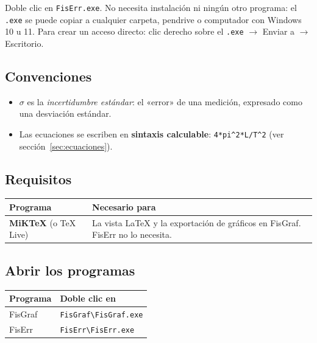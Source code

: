 \documentclass[11pt,a4paper]{article}
\newif\ifportable
\newcommand{\filarust}{}
\newcommand{\filarust}{\textbf{Rust} & Solo para compilar los programas (crear o actualizar los \code{.exe}).\\}
\newcommand{\code}[1]{\texttt{#1}}
\newcommand{\bs}{\textbackslash}
\newcommand{\menu}[1]{\textsf{#1}}
\begin{document}
Doble clic en \code{FisErr.exe}. No necesita instalación ni ningún otro programa: el \code{.exe} se puede copiar a cualquier carpeta, pendrive o computador con Windows 10 u 11. Para crear un acceso directo: clic derecho sobre el \code{.exe} $\rightarrow$ \menu{Enviar a} $\rightarrow$ \menu{Escritorio}.

\subsection{Convenciones}

\begin{itemize}
  \item $\sigma$ es la \emph{incertidumbre estándar}: el «error» de una medición, expresado como una desviación estándar.
  \item Las ecuaciones se escriben en \textbf{sintaxis calculable}: \code{4*pi\^{}2*L/T\^{}2} (ver sección~\ref{sec:ecuaciones}).
\end{itemize}
\else

\subsection{Requisitos}

\begin{tabularx}{\linewidth}{@{}lX@{}}\toprule
\textbf{Programa} & \textbf{Necesario para}\\\midrule
\textbf{MiKTeX} (o TeX Live) & La vista LaTeX y la exportación de gráficos en FisGraf. FisErr no lo necesita.\\
\filarust\bottomrule
\end{tabularx}

\subsection{Abrir los programas}

\ifportable
\begin{tabularx}{\linewidth}{@{}lX@{}}\toprule
\textbf{Programa} & \textbf{Doble clic en}\\\midrule
FisGraf & \code{FisGraf\bs FisGraf.exe}\\
FisErr & \code{FisErr\bs FisErr.exe}\\\bottomrule
\end{tabularx}
\end{document}
